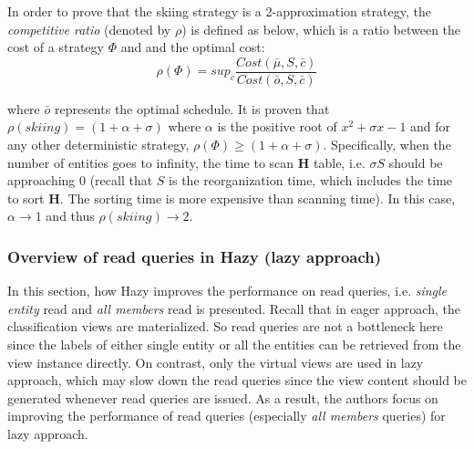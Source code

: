 In order to prove that the skiing strategy is a 2-approximation strategy, the {\em competitive ratio} (denoted by $\rho$) is defined as below, which is a ratio between the cost of a strategy $\Phi$ and and the optimal cost:
\begin{equation}
    \rho(\Phi) = sup_{\bar{c}}\frac{Cost(\bar{\mu}, S, \bar{c})}{Cost(\bar{o}, S, \bar{c})}
\end{equation}


where $\bar{o}$ represents the optimal schedule. It is proven that $\rho(skiing) = (1+\alpha + \sigma)$ where $\alpha$ is the positive root of $x^2 + \sigma x - 1$ and for any other deterministic strategy, $\rho(\Phi) \geq (1+\alpha + \sigma)$. Specifically, when the number of entities goes to infinity, the time to scan $\textbf{H}$ table, i.e. $\sigma S$ should be approaching 0 (recall that $S$ is the reorganization time, which includes the time to sort $\textbf{H}$. The sorting time is more expensive than scanning time). In this case, $\alpha \rightarrow 1$ and thus $\rho(skiing) \rightarrow 2$.

% 




\subsubsection{Overview of read queries in Hazy (lazy approach)}
In this section, how Hazy improves the performance on read queries, i.e. {\em single entity} read and {\em all members} read is presented. Recall that in eager approach, the classification views are materialized. So read queries are not a bottleneck here since the labels of either single entity or all the entities can be retrieved from the view instance directly. On contrast, only the virtual views are used in lazy approach, which may slow down the read queries since the view content should be generated whenever read queries are issued. As a result, the authors focus on improving the performance of read queries (especially {\em all members} queries) for lazy approach.


